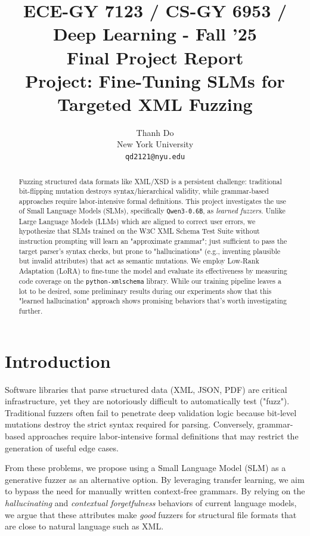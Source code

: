 \documentclass[11pt]{article}
\title{ECE-GY 7123 / CS-GY 6953 / Deep Learning - Fall '25 \\
Final Project Report \\
Project: Fine-Tuning SLMs for Targeted XML Fuzzing}
\author{Thanh Do \\
  New York University \\
  \texttt{qd2121@nyu.edu} \\}
\begin{document}
\maketitle
\begin{abstract}
Fuzzing structured data formats like XML/XSD is a persistent challenge: traditional bit-flipping mutation destroys syntax/hierarchical validity, while grammar-based approaches require labor-intensive formal definitions. This project investigates the use of Small Language Models (SLMs), specifically \texttt{Qwen3-0.6B}, as \textit{learned fuzzers}. Unlike Large Language Models (LLMs) which are aligned to correct user errors, we hypothesize that SLMs trained on the W3C XML Schema Test Suite without instruction prompting will learn an "approximate grammar"; just sufficient to pass the target parser's syntax checks, but prone to "hallucinations" (e.g., inventing plausible but invalid attributes) that act as semantic mutations. We employ Low-Rank Adaptation (LoRA) to fine-tune the model and evaluate its effectiveness by measuring code coverage on the \texttt{python-xmlschema} library. While our training pipeline leaves a lot to be desired, some preliminary results during our experiments show that this "learned hallucination" approach shows promising behaviors that's worth investigating further.
\end{abstract}

\section{Introduction}

Software libraries that parse structured data (XML, JSON, PDF) are critical infrastructure, yet they are notoriously difficult to automatically test ("fuzz"). Traditional fuzzers often fail to penetrate deep validation logic because bit-level mutations destroy the strict syntax required for parsing. Conversely, grammar-based approaches require labor-intensive formal definitions that may restrict the generation of useful edge cases.

From these problems, we propose using a Small Language Model (SLM) as a generative fuzzer as an alternative option. By leveraging transfer learning, we aim to bypass the need for manually written context-free grammars. By relying on the \textit{hallucinating} and \textit{contextual forgetfulness} behaviors of current language models, we argue that these attributes make \textit{good} fuzzers for structural file formats that are close to natural language such as XML.
\end{document}
